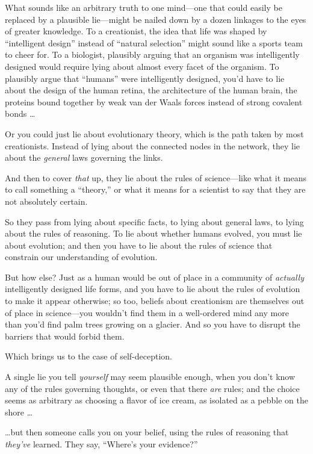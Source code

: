 {
 What sounds like an arbitrary truth to one mind---one that could
easily be replaced by a plausible lie---might be nailed down by a dozen
linkages to the eyes of greater knowledge. To a creationist, the idea
that life was shaped by ``intelligent
design'' instead of ``natural
selection'' might sound like a sports team to cheer
for. To a biologist, plausibly arguing that an organism was
intelligently designed would require lying about almost every facet of
the organism. To plausibly argue that
``humans'' were intelligently
designed, you'd have to lie about the design of the
human retina, the architecture of the human brain, the proteins bound
together by weak van der Waals forces instead of strong covalent bonds
\ldots}

{
 Or you could just lie about evolutionary theory, which is the path
taken by most creationists. Instead of lying about the connected nodes
in the network, they lie about the \textit{general} laws governing the
links.}

{
 And then to cover \textit{that} up, they lie about the rules of
science---like what it means to call something a
``theory,'' or what it means for a
scientist to say that they are not absolutely certain.}

{
 So they pass from lying about specific facts, to lying about
general laws, to lying about the rules of reasoning. To lie about
whether humans evolved, you must lie about evolution; and then you have
to lie about the rules of science that constrain our understanding of
evolution.}

{
 But how else? Just as a human would be out of place in a community
of \textit{actually} intelligently designed life forms, and you have to
lie about the rules of evolution to make it appear otherwise; so too,
beliefs about creationism are themselves out of place in science---you
wouldn't find them in a well-ordered mind any more than
you'd find palm trees growing on a glacier. And so you
have to disrupt the barriers that would forbid them.}

{
 Which brings us to the case of self-deception.}

{
 A single lie you tell \textit{yourself} may seem plausible enough,
when you don't know any of the rules governing
thoughts, or even that there \textit{are} rules; and the choice seems
as arbitrary as choosing a flavor of ice cream, as isolated as a pebble
on the shore \ldots}

{
 \ldots but then someone calls you on your belief, using the rules
of reasoning that \textit{they've} learned. They say,
``Where's your
evidence?''}

